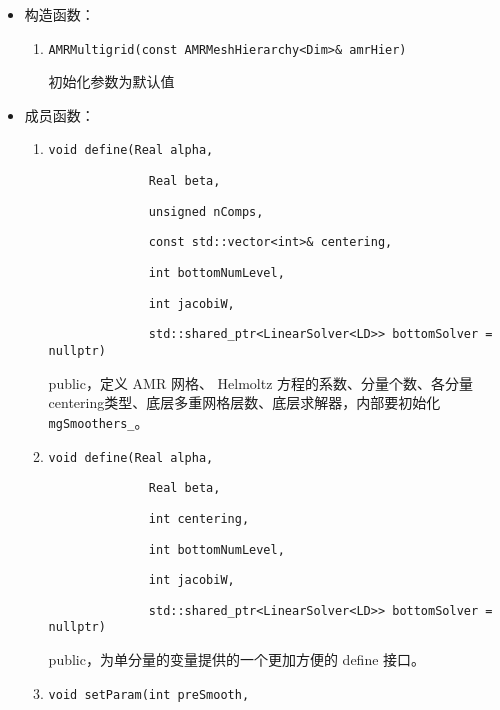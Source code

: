\documentclass[cn, bibend=bibtex]{elegantpaper}
\theoremstyle{plain}
\begin{document}
\begin{itemize}
  \item 构造函数：
  \begin{enumerate}
    \item \lstinline|AMRMultigrid(const AMRMeshHierarchy<Dim>& amrHier)|

    初始化参数为默认值
  \end{enumerate}
  \item 成员函数：
  \begin{enumerate}
    \item \lstinline|void define(Real alpha,|

          \lstinline|              Real beta,|

          \lstinline|              unsigned nComps,|

          \lstinline|              const std::vector<int>& centering,|

          \lstinline|              int bottomNumLevel,|

          \lstinline|              int jacobiW,|

          \lstinline|              std::shared_ptr<LinearSolver<LD>> bottomSolver = nullptr)|

    public，定义 AMR 网格、 Helmoltz 方程的系数、分量个数、各分量centering类型、底层多重网格层数、底层求解器，内部要初始化 \lstinline|mgSmoothers_|。

    \item \lstinline|void define(Real alpha,|

          \lstinline|              Real beta,|

          \lstinline|              int centering,|

          \lstinline|              int bottomNumLevel,|

          \lstinline|              int jacobiW,|

          \lstinline|              std::shared_ptr<LinearSolver<LD>> bottomSolver = nullptr)|
    
    public，为单分量的变量提供的一个更加方便的 define 接口。
    
    \item \lstinline|void setParam(int preSmooth,|
          

\end{enumerate}
\end{itemize}
\end{document}
